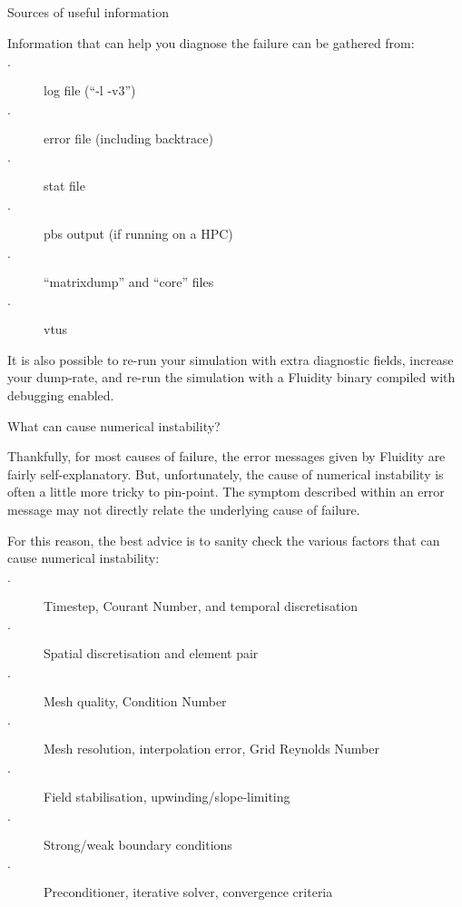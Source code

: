 \documentclass[professionalfonts, 8pt]{beamer}
\begin{document}

\begin{frame}{Sources of useful information}

Information that can help you diagnose the failure can be gathered from:
\vspace{1ex}

\begin{description}
 \item[$\cdot$] log file (``-l -v3'')
 \item[$\cdot$] error file (including backtrace)
 \item[$\cdot$] stat file
 \item[$\cdot$] pbs output (if running on a HPC)
 \item[$\cdot$] ``matrixdump'' and ``core'' files
 \item[$\cdot$] vtus
\end{description}

It is also possible to re-run your simulation with extra diagnostic fields, increase your dump-rate, 
and re-run the simulation with a Fluidity binary compiled with debugging enabled.

\end{frame}


\begin{frame}{What can cause numerical instability?}

Thankfully, for most causes of failure, the error messages given by Fluidity are fairly self-explanatory.
But, unfortunately, the cause of numerical instability is often a little more tricky to pin-point.
The symptom described within an error message may not directly relate the underlying cause of failure.

\vspace{1ex}
For this reason, the best advice is to sanity check the various factors that can cause numerical instability:
\begin{description}
 \item[$\cdot$] Timestep, Courant Number, and temporal discretisation
 \item[$\cdot$] Spatial discretisation and element pair
 \item[$\cdot$] Mesh quality, Condition Number
 \item[$\cdot$] Mesh resolution, interpolation error, Grid Reynolds Number
 \item[$\cdot$] Field stabilisation, upwinding/slope-limiting
 \item[$\cdot$] Strong/weak boundary conditions
 \item[$\cdot$] Preconditioner, iterative solver, convergence criteria
\end{description}

\end{frame}
\end{document}
